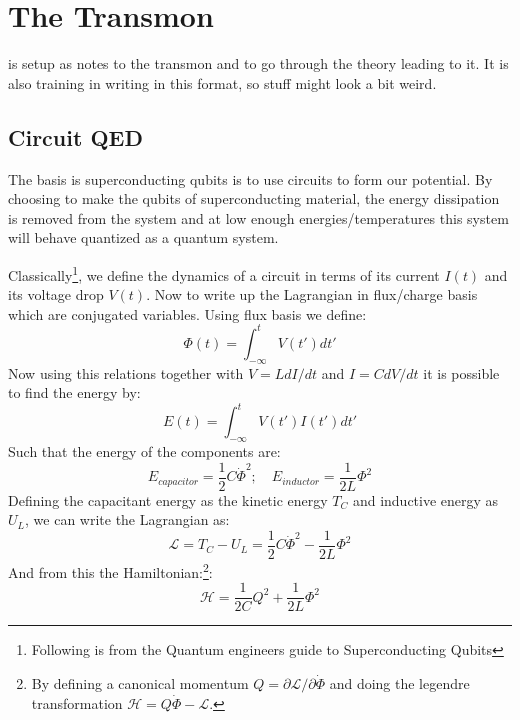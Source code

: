 \chapter{The Transmon}
 is setup as notes to the transmon and to go through the theory leading to it. It is also training in writing in this format, so stuff might look a bit weird. 

\section{Circuit QED}
The basis is superconducting qubits is to use circuits to form our potential. By choosing to make the qubits of superconducting material, the energy dissipation is removed from the system and at low enough energies/temperatures this system will behave quantized as a quantum system. 

Classically\footnote{Following is from the Quantum engineers guide to Superconducting Qubits}, we define the dynamics of a circuit in terms of its current $I(t)$ and its voltage drop $V(t)$. Now to write up the Lagrangian in flux/charge basis which are conjugated variables. Using flux basis we define:
\begin{equation}
    \Phi (t) = \int_{-\infty}^t V(t')dt'
\end{equation}
Now using this relations together with $V = L dI/dt$ and $I = C dV/dt$ it is possible to find the energy by:
\begin{equation}
    E(t) = \int_{-\infty}^t V(t')I(t')dt'
\end{equation}
Such that the energy of the components are:
\begin{equation}
    E_{capacitor} = \frac12 C \dot{\Phi}^2; \quad E_{inductor} = \frac{1}{2L} \Phi^2
\end{equation}
Defining the capacitant energy as the kinetic energy $T_C$ and inductive energy as $U_L$, we can write the Lagrangian as:
\begin{equation}
    \mathcal{L} = T_C - U_L = \frac12 C \dot{\Phi}^2 - \frac{1}{2L} \Phi^2
\end{equation}
And from this the Hamiltonian:\footnote{By defining a canonical momentum $Q = \partial \mathcal{L} / \partial \dot{\Phi}$ and doing the legendre transformation $\mathcal{H} = Q\dot{\Phi} - \mathcal{L}$.}:
\begin{equation}
    \mathcal{H} = \frac{1}{2C} Q^2 + \frac{1}{2L} \Phi^2
\end{equation}

